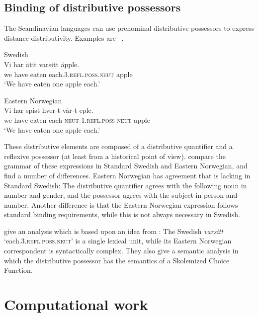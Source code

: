 \documentclass[output=paper,hidelinks]{langscibook}
\begin{document}
\subsection{Binding of distributive possessors}

The Scandinavian languages can use prenominal distributive possessors to express distance distributivity. Examples are --.



\ea\label{ex:Scandinavian:119} Swedish\\
\gll
 {Vi} {har} {ätit} {varsitt} {äpple.}\\
 we have eaten each.3.\textsc{refl.poss.neut} apple \\
\glt `We have eaten one apple each.' \z



\ea\label{ex:Scandinavian:120} Eastern Norwegian\\
\gll
 {Vi} {har} {spist} {hver-t} {vår-t} {eple.}\\
 we have eaten each-\textsc{neut} 1.\textsc{refl.poss-neut} apple \\
\glt `We have eaten one apple each.' \z

\noindent These distributive elements are composed of a distributive quantifier and a reflexive possessor (at least from a historical point of view). \citet{LST19} compare the grammar of these expressions in Standard Swedish and Eastern Norwegian, and find a number of differences. Eastern Norwegian has agreement that is lacking in Standard Swedish: The distributive quantifier agrees with the following noun in number and gender, and the possessor agrees with the subject in person and number. Another difference is that the Eastern Norwegian expression follows standard binding requirements, while this is not always necessary in Swedish.

 \citet{LST19} give an analysis which is based upon an idea from \citet{Vangsnes02}: The Swedish \textit{varsitt} `each.3.\textsc{refl.poss.neut}{}' is a single lexical unit, while its Eastern Norwegian correspondent is syntactically complex. They also give a semantic analysis in which the distributive possessor has the semantics of a Skolemized Choice Function.

 \section{Computational work}
\end{document}
